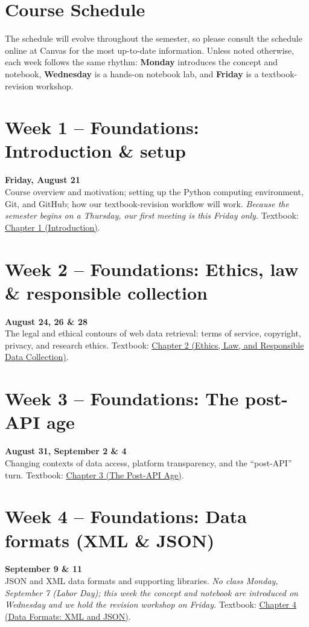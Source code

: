 \documentclass[11pt]{memoir}
\def\bookurl{https://github.com/cuinfoscience/Web-Data-Science-Book}
\begin{document}
\clearpage

\section{\textbf{Course Schedule}}

The schedule will evolve throughout the semester, so please consult the schedule online at Canvas for the most up-to-date information. Unless noted otherwise, each week follows the same rhythm: \textbf{Monday} introduces the concept and notebook, \textbf{Wednesday} is a hands-on notebook lab, and \textbf{Friday} is a textbook-revision workshop.

\section{Week 1 -- Foundations: Introduction \& setup}
\textcolor{CUGold}{\textbf{Friday, August 21}}\\
Course overview and motivation; setting up the Python computing environment, Git, and GitHub; how our textbook-revision workflow will work. \textit{Because the semester begins on a Thursday, our first meeting is this Friday only.} Textbook: \href{\bookurl/blob/main/ch-01-introduction.qmd}{Chapter 1 (Introduction)}.

\section{Week 2 -- Foundations: Ethics, law \& responsible collection}
\textcolor{CUGold}{\textbf{August 24, 26 \& 28}}\\
The legal and ethical contours of web data retrieval: terms of service, copyright, privacy, and research ethics. Textbook: \href{\bookurl/blob/main/ch-02-ethics.qmd}{Chapter 2 (Ethics, Law, and Responsible Data Collection)}.

\section{Week 3 -- Foundations: The post-API age}
\textcolor{CUGold}{\textbf{August 31, September 2 \& 4}}\\
Changing contexts of data access, platform transparency, and the ``post-API'' turn. Textbook: \href{\bookurl/blob/main/ch-03-post-api.qmd}{Chapter 3 (The Post-API Age)}.

\section{Week 4 -- Foundations: Data formats (XML \& JSON)}
\textcolor{CUGold}{\textbf{September 9 \& 11}}\\
JSON and XML data formats and supporting libraries. \textit{No class Monday, September 7 (Labor Day); this week the concept and notebook are introduced on Wednesday and we hold the revision workshop on Friday.} Textbook: \href{\bookurl/blob/main/ch-04-data-formats.qmd}{Chapter 4 (Data Formats: XML and JSON)}.
\end{document}
